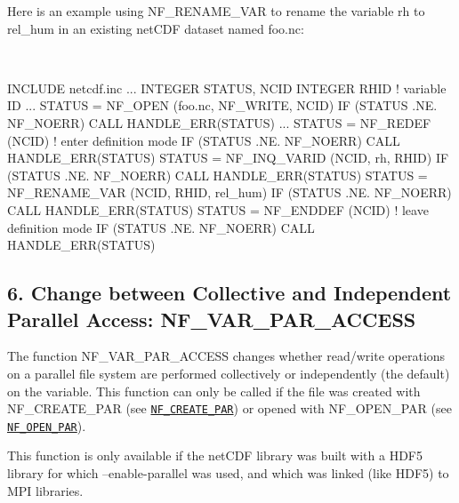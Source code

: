 Here is an example using N\+F\+\_\+\+R\+E\+N\+A\+M\+E\+\_\+\+V\+AR to rename the variable rh to rel\+\_\+hum in an existing net\+C\+DF dataset named foo.\+nc\+:

 

I\+N\+C\+L\+U\+DE \textquotesingle{}netcdf.\+inc\textquotesingle{} ... I\+N\+T\+E\+G\+ER S\+T\+A\+T\+US, N\+C\+ID I\+N\+T\+E\+G\+ER R\+H\+ID ! variable ID ... S\+T\+A\+T\+US = N\+F\+\_\+\+O\+P\+EN (\textquotesingle{}foo.\+nc\textquotesingle{}, N\+F\+\_\+\+W\+R\+I\+TE, N\+C\+ID) IF (S\+T\+A\+T\+US .NE. N\+F\+\_\+\+N\+O\+E\+RR) C\+A\+LL H\+A\+N\+D\+L\+E\+\_\+\+E\+R\+R(\+S\+T\+A\+T\+U\+S) ... S\+T\+A\+T\+US = N\+F\+\_\+\+R\+E\+D\+EF (N\+C\+ID) ! enter definition mode IF (S\+T\+A\+T\+US .NE. N\+F\+\_\+\+N\+O\+E\+RR) C\+A\+LL H\+A\+N\+D\+L\+E\+\_\+\+E\+R\+R(\+S\+T\+A\+T\+U\+S) S\+T\+A\+T\+US = N\+F\+\_\+\+I\+N\+Q\+\_\+\+V\+A\+R\+ID (N\+C\+ID, \textquotesingle{}rh\textquotesingle{}, R\+H\+ID) IF (S\+T\+A\+T\+US .NE. N\+F\+\_\+\+N\+O\+E\+RR) C\+A\+LL H\+A\+N\+D\+L\+E\+\_\+\+E\+R\+R(\+S\+T\+A\+T\+U\+S) S\+T\+A\+T\+US = N\+F\+\_\+\+R\+E\+N\+A\+M\+E\+\_\+\+V\+AR (N\+C\+ID, R\+H\+ID, \textquotesingle{}rel\+\_\+hum\textquotesingle{}) IF (S\+T\+A\+T\+US .NE. N\+F\+\_\+\+N\+O\+E\+RR) C\+A\+LL H\+A\+N\+D\+L\+E\+\_\+\+E\+R\+R(\+S\+T\+A\+T\+U\+S) S\+T\+A\+T\+US = N\+F\+\_\+\+E\+N\+D\+D\+EF (N\+C\+ID) ! leave definition mode IF (S\+T\+A\+T\+US .NE. N\+F\+\_\+\+N\+O\+E\+RR) C\+A\+LL H\+A\+N\+D\+L\+E\+\_\+\+E\+R\+R(\+S\+T\+A\+T\+U\+S)

\subsection*{6. Change between Collective and Independent Parallel Access\+: N\+F\+\_\+\+V\+A\+R\+\_\+\+P\+A\+R\+\_\+\+A\+C\+C\+E\+SS }

The function N\+F\+\_\+\+V\+A\+R\+\_\+\+P\+A\+R\+\_\+\+A\+C\+C\+E\+SS changes whether read/write operations on a parallel file system are performed collectively or independently (the default) on the variable. This function can only be called if the file was created with N\+F\+\_\+\+C\+R\+E\+A\+T\+E\+\_\+\+P\+AR (see \href{#NF_005fCREATE_005fPAR}{\tt N\+F\+\_\+\+C\+R\+E\+A\+T\+E\+\_\+\+P\+AR}) or opened with N\+F\+\_\+\+O\+P\+E\+N\+\_\+\+P\+AR (see \href{#NF_005fOPEN_005fPAR}{\tt N\+F\+\_\+\+O\+P\+E\+N\+\_\+\+P\+AR}).

This function is only available if the net\+C\+DF library was built with a H\+D\+F5 library for which –enable-\/parallel was used, and which was linked (like H\+D\+F5) to M\+PI libraries.

